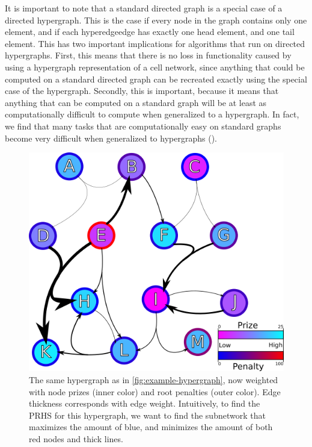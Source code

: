 \documentclass[12pt,twoside]{reedthesis}
\theoremstyle{definition}
\begin{document}
It is important to note that a standard directed graph is a special case of a directed hypergraph.  This is the case if every node in the graph contains only one element, and if each hyperedgeedge has exactly one head element, and one tail element.  This has two important implications for algorithms that run on directed hypergraphs.  First, this means that there is no loss in functionality caused by using a hypergraph representation of a cell network, since anything that could be computed on a standard directed graph can be recreated exactly using the special case of the hypergraph. Secondly, this is important, because it means that anything that can be computed on a standard graph will be at least as computationally difficult to compute when generalized to a hypergraph.  In fact, we find that many tasks that are computationally easy on standard graphs become very difficult when generalized to hypergraphs (\cite{Ritz2014a}).\par

\begin{figure}[thbp]
  \begin{center}
    \includegraphics[width=\textwidth/2]{example-hypergraph-weighted}
  \caption[A weighted hypergraph]{The same hypergraph as in \ref{fig:example-hypergraph}, now weighted with node prizes (inner color) and root penalties (outer color). Edge thickness corresponds with edge weight. Intuitively, to find the PRHS for this hypergraph, we want to find the subnetwork that maximizes the amount of blue, and minimizes the amount of both red nodes and thick lines.}
  \label{fig:example-hypergraph-weighted}
  \end{center}
\end{figure}
\end{document}
